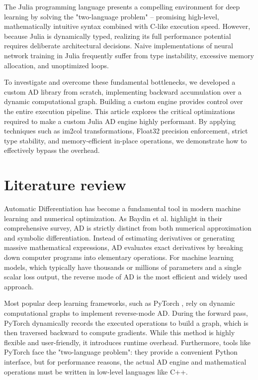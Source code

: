 \documentclass[conference]{IEEEtran}
\begin{document}
The Julia programming language presents a compelling environment for deep learning by solving the "two-language problem" -- promising high-level, mathematically intuitive syntax combined with C-like execution speed. However, because Julia is dynamically typed, realizing its full performance potential requires deliberate architectural decisions. Naive implementations of neural network training in Julia frequently suffer from type instability, excessive memory allocation, and unoptimized loops.

To investigate and overcome these fundamental bottlenecks, we developed a custom AD library from scratch, implementing backward accumulation over a dynamic computational graph. Building a custom engine provides control over the entire execution pipeline. This article explores the critical optimizations required to make a custom Julia AD engine highly performant. By applying techniques such as im2col transformations, Float32 precision enforcement, strict type stability, and memory-efficient in-place operations, we demonstrate how to effectively bypass the overhead.

\section{Literature review}
Automatic Differentiation has become a fundamental tool in modern machine learning and numerical optimization. As Baydin et al. \cite{baydin2018} highlight in their comprehensive survey, AD is strictly distinct from both numerical approximation and symbolic differentiation. Instead of estimating derivatives or generating massive mathematical expressions, AD evaluates exact derivatives by breaking down computer programs into elementary operations. For machine learning models, which typically have thousands or millions of parameters and a single scalar loss output, the reverse mode of AD is the most efficient and widely used approach.

Most popular deep learning frameworks, such as PyTorch \cite{paszke2019}, rely on dynamic computational graphs to implement reverse-mode AD. During the forward pass, PyTorch dynamically records the executed operations to build a graph, which is then traversed backward to compute gradients. While this method is highly flexible and user-friendly, it introduces runtime overhead. Furthermore, tools like PyTorch face the "two-language problem": they provide a convenient Python interface, but for performance reasons, the actual AD engine and mathematical operations must be written in low-level languages like C++. 
\end{document}
